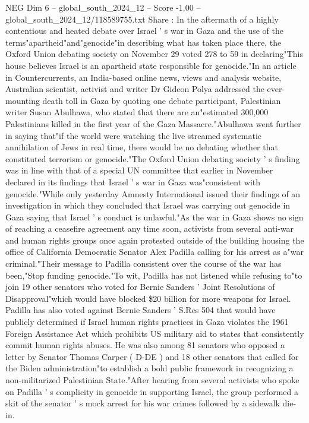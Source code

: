 \begin{textsample}{NEG Dim 6 – global\_south\_2024\_12 – Score -1.00 – global\_south\_2024\_12/118589755.txt}  \label{ex:f6_neg_027}
Share : In the aftermath of a highly contentious and heated debate over Israel ' s war in Gaza and the use of the terms"apartheid"and"genocide"in describing what has taken place there, the Oxford Union debating society on November 29 voted 278 to 59 in declaring"This house believes Israel is an apartheid state responsible for genocide."In an article in Countercurrents, an India-based online news, views and analysis website, Australian scientist, activist and writer Dr Gideon Polya addressed the ever-mounting death toll in Gaza by quoting one debate participant, Palestinian writer Susan Abulhawa, who stated that there are an"estimated 300,000 Palestinians killed in the first year of the Gaza Massacre."Abulhawa went further in saying that"if the world were watching the live streamed systematic annihilation of Jews in real time, there would be no debating whether that constituted terrorism or genocide."The Oxford Union debating society ' s finding was in line with that of a special UN committee that earlier in November declared in its findings that Israel ' s war in Gaza was"consistent with genocide."While only yesterday Amnesty International issued their findings of an investigation in which they concluded that Israel was carrying out genocide in Gaza saying that Israel ' s conduct is unlawful."As the war in Gaza shows no sign of reaching a ceasefire agreement any time soon, activists from several anti-war and human rights groups once again protested outside of the building housing the office of California Democratic Senator Alex Padilla calling for his arrest as a"war criminal."Their message to Padilla consistent over the course of the war has been,"Stop funding genocide."To wit, Padilla has not listened while refusing to"to join 19 other senators who voted for Bernie Sanders ' Joint Resolutions of Disapproval"which would have blocked \$20 billion for more weapons for Israel.
Padilla has also voted against Bernie Sanders ' S.Res 504 that would have publicly determined if Israel human rights practices in Gaza violates the 1961 Foreign Assistance Act which prohibits US military aid to states that consistently commit human rights abuses.
He was also among 81 senators who opposed a letter by Senator Thomas Carper ( D-DE ) and 18 other senators that called for the Biden administration"to establish a bold public framework in recognizing a non-militarized Palestinian State."After hearing from several activists who spoke on Padilla ' s complicity in genocide in supporting Israel, the group performed a skit of the senator ' s mock arrest for his war crimes followed by a sidewalk die-in.

\end{textsample}
